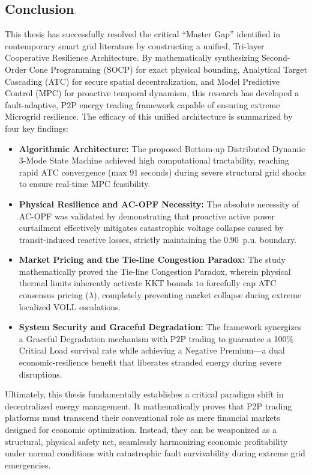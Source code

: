 \subsection{Conclusion}
This thesis has successfully resolved the critical ``Master Gap'' identified in contemporary smart grid literature by constructing a unified, Tri-layer Cooperative Resilience Architecture. By mathematically synthesizing Second-Order Cone Programming (SOCP) for exact physical bounding, Analytical Target Cascading (ATC) for secure spatial decentralization, and Model Predictive Control (MPC) for proactive temporal dynamism, this research has developed a fault-adaptive, P2P energy trading framework capable of ensuring extreme Microgrid resilience. The efficacy of this unified architecture is summarized by four key findings:
\begin{itemize}
    \item \textbf{Algorithmic Architecture:} The proposed Bottom-up Distributed Dynamic 3-Mode State Machine achieved high computational tractability, reaching rapid ATC convergence (max 91 seconds) during severe structural grid shocks to ensure real-time MPC feasibility.
    \item \textbf{Physical Resilience and AC-OPF Necessity:} The absolute necessity of AC-OPF was validated by demonstrating that proactive active power curtailment effectively mitigates catastrophic voltage collapse caused by transit-induced reactive losses, strictly maintaining the 0.90~p.u. boundary.
    \item \textbf{Market Pricing and the Tie-line Congestion Paradox:} The study mathematically proved the Tie-line Congestion Paradox, wherein physical thermal limits inherently activate KKT bounds to forcefully cap ATC consensus pricing ($\lambda$), completely preventing market collapse during extreme localized VOLL escalations.
    \item \textbf{System Security and Graceful Degradation:} The framework synergizes a Graceful Degradation mechanism with P2P trading to guarantee a 100\% Critical Load survival rate while achieving a Negative Premium---a dual economic-resilience benefit that liberates stranded energy during severe disruptions.
\end{itemize}

Ultimately, this thesis fundamentally establishes a critical paradigm shift in decentralized energy management. It mathematically proves that P2P trading platforms must transcend their conventional role as mere financial markets designed for economic optimization. Instead, they can be weaponized as a structural, physical safety net, seamlessly harmonizing economic profitability under normal conditions with catastrophic fault survivability during extreme grid emergencies.


